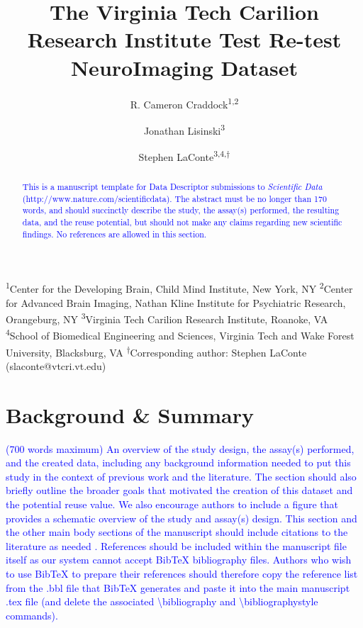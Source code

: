 \documentclass[english,11pt]{article}
\begin{document}
\title{The Virginia Tech Carilion Research Institute Test Re-test NeuroImaging Dataset}

\author{R. Cameron Craddock\textsuperscript{1,2} \and  
        Jonathan Lisinski\textsuperscript{3} \and 
        Stephen LaConte\textsuperscript{3,4,$\dagger$}}


\maketitle

\textsuperscript{1}Center for the Developing Brain, Child Mind Institute, New York, NY
\textsuperscript{2}Center for Advanced Brain Imaging, Nathan Kline Institute for Psychiatric Research,      
    Orangeburg, NY
\textsuperscript{3}Virginia Tech Carilion Research Institute, Roanoke, VA
\textsuperscript{4}School of Biomedical Engineering and Sciences, Virginia Tech and Wake Forest University,
    Blacksburg, VA
\textsuperscript{$\dagger$}Corresponding author: Stephen LaConte (slaconte@vtcri.vt.edu)


\begin{abstract}
\textcolor{blue}{This is a manuscript template for Data Descriptor submissions to \emph{Scientific
Data} (http://www.nature.com/scientificdata). The abstract must be
no longer than 170 words, and should succinctly describe the study,
the assay(s) performed, the resulting data, and the reuse potential,
but should not make any claims regarding new scientific findings.
No references are allowed in this section.}
\end{abstract}

\section*{Background \& Summary}

\textcolor{blue}{(700 words maximum) An overview of the study design, the assay(s)
performed, and the created data, including any background information
needed to put this study in the context of previous work and the literature.
The section should also briefly outline the broader goals that motivated
the creation of this dataset and the potential reuse value. We also
encourage authors to include a figure that provides a schematic overview
of the study and assay(s) design. This section and the other main
body sections of the manuscript should include citations to the literature
as needed \cite{cite1, cite2}. References should be included within the 
manuscript file itself as our system cannot accept BibTeX bibliography files. 
Authors who wish to use BibTeX to prepare their references should therefore 
copy the reference list from the .bbl file that BibTeX generates and paste it 
into the main manuscript .tex file (and delete the associated 
\textbackslash{}bibliography and \textbackslash{}bibliographystyle commands).}
\end{document}
